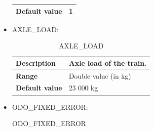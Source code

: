 \documentclass{template/openetcs}
\begin{document}
\begin{itemize}
\begin{longtable}{|l|l|}
				\hline
				
					\begin{minipage}[t]{0.22\linewidth} \textbf{Default value}	\end{minipage} 
				&	\begin{minipage}[t]{0.78\linewidth} 1 \end{minipage} \\
				
				\hline
				
			\end{longtable}
			
		\item AXLE\_LOAD:
																															
			\begin{longtable}{|l|l|}
				\caption{AXLE\_LOAD}\\ 
				\hline
				
					\begin{minipage}[t]{0.22\linewidth} \textbf{Description}	\end{minipage} 
				&	\begin{minipage}[t]{0.78\linewidth} Axle load of the train. \end{minipage} \\
				
				\hline
																																									
					\begin{minipage}[t]{0.22\linewidth} \textbf{Range}	\end{minipage} 
				&	\begin{minipage}[t]{0.78\linewidth} Double value (in kg) \end{minipage} \\
				
				\hline
				
					\begin{minipage}[t]{0.22\linewidth} \textbf{Default value}	\end{minipage} 
				&	\begin{minipage}[t]{0.78\linewidth} 23 000 kg \end{minipage} \\
				
				\hline
				
			\end{longtable}

		\item ODO\_FIXED\_ERROR:
																															
			\begin{longtable}{|l|l|}
				\caption{ODO\_FIXED\_ERROR}\\ 
				\hline
				

\end{longtable}
\end{itemize}
\end{document}
